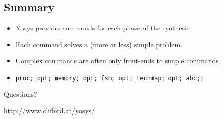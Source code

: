 
\subsection{Summary}

\begin{frame}{\subsecname}
\begin{itemize}
\item Yosys provides commands for each phase of the synthesis.
\item Each command solves a (more or less) simple problem.
\item Complex commands are often only front-ends to simple commands.
\item {\tt proc; opt; memory; opt; fsm; opt; techmap; opt; abc;;}
\end{itemize}

\bigskip
\bigskip
\begin{center}
Questions?
\end{center}

\bigskip
\bigskip
\begin{center}
\url{http://www.clifford.at/yosys/}
\end{center}
\end{frame}

